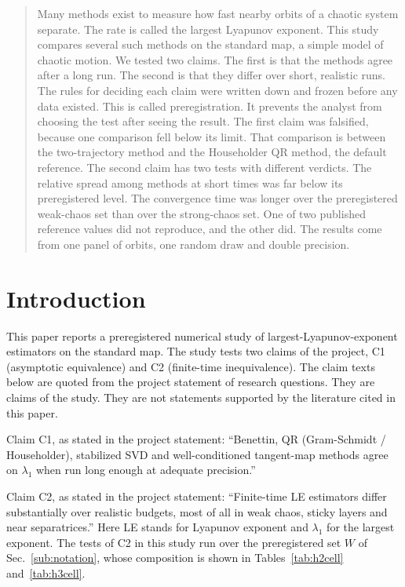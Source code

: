 \documentclass[aip,cha,reprint,amsmath,amssymb,longbibliography]{revtex4-2}
\newcommand{\Sec}[1]{Sec.~\ref{#1}}
\begin{document}
\begin{quotation}
Many methods exist to measure how fast nearby orbits of a chaotic system separate.
The rate is called the largest Lyapunov exponent.
This study compares several such methods on the standard map, a simple model of chaotic motion.
We tested two claims.
The first is that the methods agree after a long run.
The second is that they differ over short, realistic runs.
The rules for deciding each claim were written down and frozen before any data existed.
This is called preregistration.
It prevents the analyst from choosing the test after seeing the result.
The first claim was falsified, because one comparison fell below its limit.
That comparison is between the two-trajectory method and the Householder QR method, the default reference.
The second claim has two tests with different verdicts.
The relative spread among methods at short times was far below its preregistered level.
The convergence time was longer over the preregistered weak-chaos set than over the strong-chaos set.
One of two published reference values did not reproduce, and the other did.
The results come from one panel of orbits, one random draw and double precision.
\end{quotation}

\section{Introduction}
\label{sec:intro}

This paper reports a preregistered numerical study of largest-Lyapunov-exponent estimators on the standard map.
The study tests two claims of the project, C1 (asymptotic equivalence) and C2 (finite-time inequivalence).
The claim texts below are quoted from the project statement of research questions.
They are claims of the study.
They are not statements supported by the literature cited in this paper.

Claim C1, as stated in the project statement: ``Benettin, QR (Gram-Schmidt / Householder), stabilized SVD and well-conditioned tangent-map methods agree on $\lambda_1$ when run long enough at adequate precision.''

Claim C2, as stated in the project statement: ``Finite-time LE estimators differ substantially over realistic budgets, most of all in weak chaos, sticky layers and near separatrices.''
Here LE stands for Lyapunov exponent and $\lambda_1$ for the largest exponent.
The tests of C2 in this study run over the preregistered set $W$ of \Sec{sub:notation}, whose composition is shown in Tables~\ref{tab:h2cell} and~\ref{tab:h3cell}.
\end{document}
